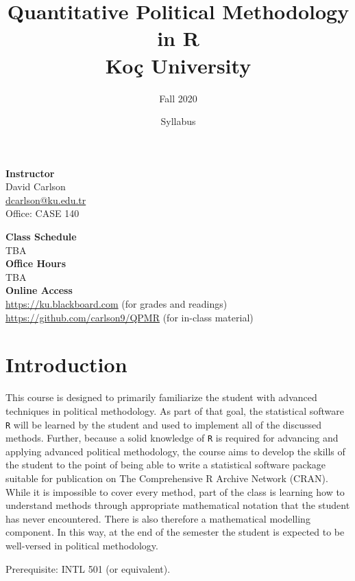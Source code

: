 \documentclass[12pt]{article}
\title{Quantitative Political Methodology in R\\
{\Large Ko\c{c} University}}
\author{Fall 2020}
\date{Syllabus}
\begin{document}
\maketitle

\hline
\vspace{2em}
\begin{minipage}[t]{.3\linewidth}
\textbf{Instructor}\\
David Carlson\\
\href{mailto:dcarlson@ku.edu.tr}{dcarlson@ku.edu.tr}\\
Office: CASE 140
\end{minipage}
\begin{minipage}[t]{.7\linewidth}
\textbf{Class Schedule}\\
TBA\\
\textbf{Office Hours}\\
TBA\\
\textbf{Online Access}\\
\href{https://ku.blackboard.com}{https://ku.blackboard.com} (for grades and readings)\\
\href{https://github.com/carlson9/QPMR}{https://github.com/carlson9/QPMR} (for in-class material)
\end{minipage}
\vspace{2em}
\hline

\section*{Introduction}

\noindent This course is designed to primarily familiarize the student with advanced techniques in political methodology. As part of that goal, the statistical software \texttt{R} will be learned by the student and used to implement all of the discussed methods. Further, because a solid knowledge of \texttt{R} is required for advancing and applying advanced political methodology, the course aims to develop the skills of the student to the point of being able to write a statistical software package suitable for publication on The Comprehensive R Archive Network (CRAN). While it is impossible to cover every method, part of the class is learning how to understand methods through appropriate mathematical notation that the student has never encountered. There is also therefore a mathematical modelling component. In this way, at the end of the semester the student is expected to be well-versed in political methodology.

\noindent Prerequisite: INTL 501 (or equivalent).
\end{document}
